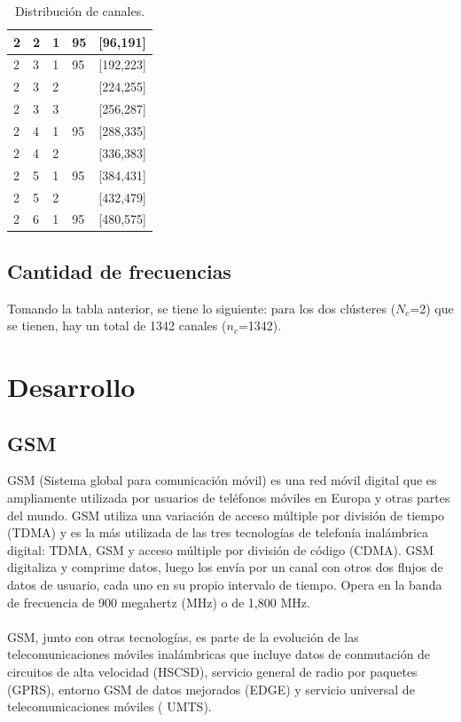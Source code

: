 \documentclass[11pt,letterpaper]{article}
\begin{document}
\begin{table}[ht]
\begin{tabular}{|l|l|l|l|l|}
    2 & 2 & 1 & 95 & [96,191] \\ \hline

    2 & 3 & 1 & 95 & [192,223] \\ \hline
    2 & 3 & 2 &  & [224,255] \\ \hline
    2 & 3 & 3 &  & [256,287] \\ \hline

    2 & 4 & 1 & 95 & [288,335] \\ \hline
    2 & 4 & 2 &  & [336,383] \\ \hline

    2 & 5 & 1 & 95 & [384,431] \\ \hline
    2 & 5 & 2 &  & [432,479] \\ \hline

    2 & 6 & 1 & 95 & [480,575] \\ \hline
    \end{tabular}
    \caption{Distribución de canales.}
\end{table}

\subsection{Cantidad de frecuencias}
Tomando la tabla anterior, se tiene lo siguiente: para los dos clústeres ($N_c$=2) 
que se tienen, hay un total de 1342 canales ($n_c$=1342).

\newpage
\section{Desarrollo}
\subsection{GSM}
GSM (Sistema global para comunicación móvil) es una red móvil digital que es ampliamente 
utilizada por usuarios de teléfonos móviles en Europa y otras partes del mundo. GSM 
utiliza una variación de acceso múltiple por división de tiempo (TDMA) y es la más 
utilizada de las tres tecnologías de telefonía inalámbrica digital: TDMA, GSM y acceso 
múltiple por división de código (CDMA). GSM digitaliza y comprime datos, luego los 
envía por un canal con otros dos flujos de datos de usuario, cada uno en su propio 
intervalo de tiempo. Opera en la banda de frecuencia de 900 megahertz (MHz) o de 1,800 MHz.
\\ \\
GSM, junto con otras tecnologías, es parte de la evolución de las telecomunicaciones 
móviles inalámbricas que incluye datos de conmutación de circuitos de alta velocidad 
(HSCSD), servicio general de radio por paquetes (GPRS), entorno GSM de datos mejorados 
(EDGE) y servicio universal de telecomunicaciones móviles ( UMTS).
\end{document}
